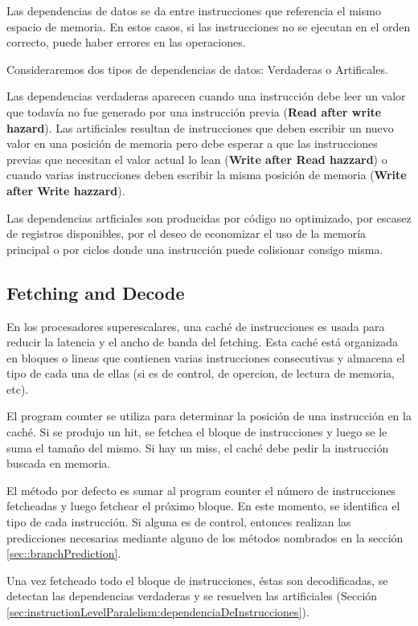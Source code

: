 Las dependencias de datos se da entre instrucciones que referencia el mismo espacio de memoria. En estos casos, si las instrucciones no se ejecutan en el orden correcto, puede haber errores en las operaciones. 

Consideraremos dos tipos de dependencias de datos: Verdaderas o Artificales.

Las dependencias verdaderas aparecen cuando una instrucción debe leer un valor que todavía no fue generado por una instrucción previa (\textbf{Read after write hazard}). Las artificiales resultan de instrucciones que deben escribir un nuevo valor en una posición de memoria pero debe esperar a que las instrucciones previas que necesitan el valor actual lo lean (\textbf{Write after Read hazzard}) o cuando varias instrucciones deben escribir la misma posición de memoria (\textbf{Write after Write hazzard}).

Las dependencias artficiales son producidas por código no optimizado, por escasez de registros disponibles, por el deseo de economizar el uso de la memoría principal o por ciclos donde una instrucción puede colisionar consigo misma.

\subsection{Fetching and Decode}
En los procesadores superescalares, una caché de instrucciones es usada para reducir la latencia y el ancho de banda del fetching. Esta caché está organizada en bloques o lineas que contienen varias instrucciones consecutivas y almacena el tipo de cada una de ellas (si es de control, de opercion, de lectura de memoria, etc). 

El program counter se utiliza para determinar la posición de una instrucción en la caché. Si se produjo un hit, se fetchea el bloque de instrucciones y luego se le suma el tamaño del mismo. Si hay un miss, el caché debe pedir la instrucción buscada en memoria.

El método por defecto es sumar al program counter el número de instrucciones fetcheadas y luego fetchear el próximo bloque. En este momento, se identifica el tipo de cada instrucción. Si alguna es de control, entonces realizan las predicciones necesarias mediante alguno de los métodos nombrados en la sección \ref{sec::branchPrediction}.

Una vez fetcheado todo el bloque de instrucciones, éstas son decodificadas, se detectan las dependencias verdaderas y se resuelven las artificiales (Sección \ref{sec:instructionLevelParalelism:dependenciaDeInstrucciones}).  


